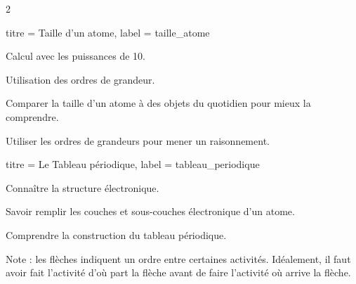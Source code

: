 \begin{multicols}{2}
  \medskip
  \setcounter{activiteNum}{0}
  \begin{activite}{titre = Taille d'un atome, label = taille_atome}
    \begin{prerequis}
      \item Calcul avec les puissances de 10.
      \item Utilisation des ordres de grandeur.
    \end{prerequis}
    \begin{objectifs}
      \item Comparer la taille d'un atome à des objets du quotidien pour mieux la comprendre.
      \item Utiliser les ordres de grandeurs pour mener un raisonnement.
    \end{objectifs}
  \end{activite}

  \medskip
  \begin{TP}{titre = Le Tableau périodique, label = tableau_periodique}
    \begin{prerequis}
      \item Connaître la structure électronique.
      \item Savoir remplir les couches et sous-couches électronique d'un atome.
    \end{prerequis}
    \begin{objectifs}
      \item Comprendre la construction du tableau périodique.
    \end{objectifs}
  \end{TP}
\end{multicols}

\vspace*{-2cm}

\vspace*{1.5cm}
Note : les flèches indiquent un ordre entre certaines activités.
Idéalement, il faut avoir fait l'activité d'où part la flèche avant de faire l'activité où arrive la flèche.


\newpage
\nomPrenomClasse
{}
\medskip

